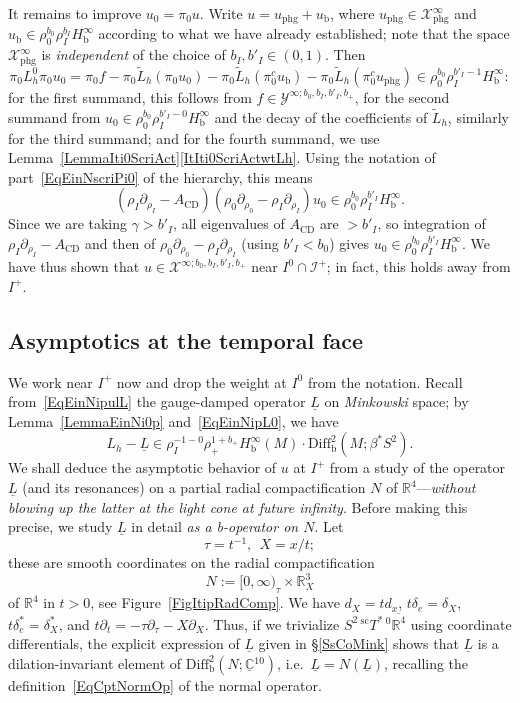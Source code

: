 \documentclass[reqno,11pt,letterpaper]{amsart}
\numberwithin{equation}{section}
\numberwithin{figure}{section}
\theoremstyle{definition}
\theoremstyle{remark}
\newcommand{\mc}{\mathcal}
\newcommand{\cX}{\mc X}
\newcommand{\cY}{\mc Y}
\newcommand{\ms}{\mathscr}
\newcommand{\scri}{\ms I}
\newcommand{\C}{\mathbb{C}}
\newcommand{\R}{\mathbb{R}}
\newcommand{\CD}{{\mathrm{CD}}}
\newcommand{\ol}{\overline}
\newcommand{\pa}{\partial}
\newcommand{\ul}[1]{\underline{#1}{}}
\newcommand{\wt}{\widetilde}
\newcommand{\bop}{{\mathrm{b}}}
\newcommand{\scl}{{\mathrm{sc}}}
\newcommand{\Diff}{\mathrm{Diff}}
\newcommand{\Diffb}{\Diff_\bop}
\newcommand{\Tsc}{{}^{\scl}T}
\newcommand{\Hb}{H_{\bop}}
\newcommand{\phg}{{\mathrm{phg}}}
\begin{document}
It remains to improve $u_0=\pi_0 u$. Write $u=u_\phg+u_\bop$, where $u_\phg\in\cX_\phg^\infty$ and $u_\bop\in\rho_0^{b_0}\rho_I^{b_I}\Hb^\infty$ according to what we have already established; note that the space $\cX_\phg^\infty$ is \emph{independent} of the choice of $b_I,b'_I\in(0,1)$. Then
\[
  \pi_0 L_h^0\pi_0 u_0 = \pi_0 f - \pi_0\wt L_h(\pi_0 u_0) - \pi_0\wt L_h(\pi_0^c u_\bop) - \pi_0\wt L_h(\pi_0^c u_\phg) \in \rho_0^{b_0}\rho_I^{b'_I-1}\Hb^\infty:
\]
for the first summand, this follows from $f\in\cY^{\infty;b_0,b_I,b'_I,b_+}$, for the second summand from $u_0\in\rho_0^{b_0}\rho_I^{b'_I-0}\Hb^\infty$ and the decay of the coefficients of $\wt L_h$, similarly for the third summand; and for the fourth summand, we use Lemma~\ref{LemmaIti0ScriAct}\eqref{ItIti0ScriActwtLh}. Using the notation of part~\eqref{EqEinNscriPi0} of the hierarchy, this means
\[
  (\rho_I\pa_{\rho_I}-A_\CD)(\rho_0\pa_{\rho_0}-\rho_I\pa_{\rho_I})u_0 \in \rho_0^{b_0}\rho_I^{b'_I}\Hb^\infty.
\]
Since we are taking $\gamma>b'_I$, all eigenvalues of $A_\CD$ are $>b'_I$, so integration of $\rho_I\pa_{\rho_I}-A_\CD$ and then of $\rho_0\pa_{\rho_0}-\rho_I\pa_{\rho_I}$ (using $b'_I<b_0$) gives $u_0\in\rho_0^{b_0}\rho_I^{b'_I}\Hb^\infty$. We have thus shown that $u\in\cX^{\infty;b_0,b_I,b'_I,b_+}$ near $I^0\cap\scri^+$; in fact, this holds away from $I^+$.


\subsection{Asymptotics at the temporal face}
\label{SsItip}

We work near $I^+$ now and drop the weight at $I^0$ from the notation. Recall from~\eqref{EqEinNipulL} the gauge-damped operator $\ul L$ on \emph{Minkowski} space; by Lemma~\ref{LemmaEinNi0p} and~\eqref{EqEinNipL0}, we have
\begin{equation}
\label{EqItipLhMinusL}
  L_h-\ul L\in \rho_I^{-1-0}\rho_+^{1+b_+}\Hb^\infty(M)\cdot\Diffb^2(M;\beta^*S^2).
\end{equation}
We shall deduce the asymptotic behavior of $u$ at $I^+$ from a study of the operator $\ul L$ (and its resonances) on a partial radial compactification $N$ of $\R^4$---\emph{without blowing up the latter at the light cone at future infinity}. Before making this precise, we study $\ul L$ in detail \emph{as a b-operator on $N$}. Let
\[
  \tau=t^{-1},\ \ X=x/t;
\]
these are smooth coordinates on the radial compactification
\[
  N:=[0,\infty)_\tau\times\R^3_X
\]
of $\R^4$ in $t>0$, see Figure~\ref{FigItipRadComp}. We have $d_X=t d_x$, $t\delta_e=\delta_X$, $t\delta_e^*=\delta_X^*$, and $t\pa_t=-\tau\pa_\tau-X\pa_X$. Thus, if we trivialize $S^2\,\Tsc^*\,{}^0\ol{\R^4}$ using coordinate differentials, the explicit expression of $\ul L$ given in \S\ref{SsCoMink} shows that $\ul L$ is a dilation-invariant element of $\Diffb^2(N;\ul\C^{10})$, i.e.\ $\ul L=N(\ul L)$, recalling the definition~\eqref{EqCptNormOp} of the normal operator.
\end{document}
